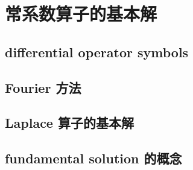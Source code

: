 \section{常系数算子的基本解}
\label{b2:sec:0504}


\subsection{differential operator symbols}
\label{b2:subsec:050401}

\subsection{Fourier 方法}
\label{b2:subsec:050402}

\subsection{Laplace 算子的基本解}
\label{b2:subsec:050403}

\subsection{fundamental solution 的概念}
\label{b2:subsec:050404}



